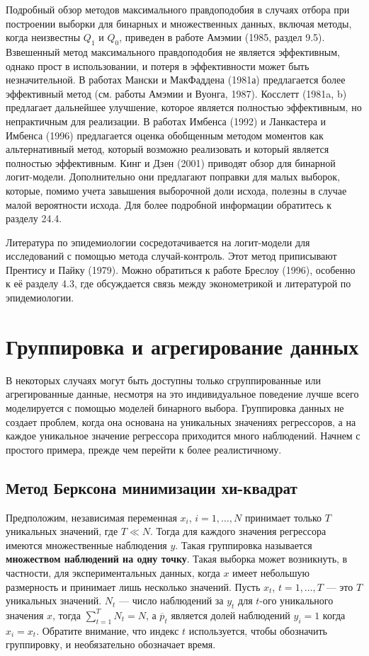 Подробный обзор   методов максимального правдоподобия в случаях отбора при построении выборки для бинарных и множественных данных,  включая методы,  когда неизвестны $Q_1$ и $Q_0$,  приведен в работе Амэмии (1985,  раздел 9.5). Взвешенный метод максимального правдоподобия не является эффективным,  однако прост в использовании,  и потеря в эффективности может быть незначительной. В работах Мански и МакФаддена (1981а) предлагается более эффективный метод (см. работы Амэмии и Вуонга,  1987). Косслетт (1981a, b) предлагает дальнейшее улучшение,  которое является полностью эффективным,  но непрактичным для реализации. В работах Имбенса  (1992)  и Ланкастера и Имбенса  (1996)  предлагается оценка обобщенным методом моментов как альтернативный метод,  который возможно реализовать и который является полностью эффективным. Кинг и Дзен  (2001)  приводят обзор для бинарной логит-модели. Дополнительно они предлагают поправки для малых выборок, которые,  помимо учета завышения выборочной доли исхода, полезны  в случае малой вероятности исхода. Для более подробной информации обратитесь к разделу 24.4.

Литература по эпидемиологии сосредотачивается на логит-модели для исследований с помощью метода случай-контроль. Этот метод приписывают Прентису и Пайку  (1979). Можно обратиться к работе Бреслоу  (1996),  особенно к её разделу 4.3,  где обсуждается связь между эконометрикой и литературой по эпидемиологии.

\section{ Группировка и агрегирование данных}

В некоторых случаях могут быть доступны только сгруппированные или агрегированные данные,  несмотря на это индивидуальное поведение лучше всего моделируется с помощью моделей бинарного выбора. Группировка данных не создает проблем,  когда она основана на уникальных значениях регрессоров,  а на каждое уникальное значение регрессора приходится много наблюдений.  Начнем с простого примера,  прежде чем перейти к более реалистичному.

\subsection{Метод Берксона минимизации хи-квадрат}

Предположим,  независимая переменная $x_i$, $i=1, \ldots, N$ принимает только $T$ уникальных значений,  где $T\ll N$. Тогда для каждого значения регрессора имеются множественные наблюдения $y$. Такая группировка называется \textbf{множеством наблюдений на одну точку}. Такая выборка может возникнуть,  в частности,  для экспериментальных данных,  когда $x$ имеет небольшую размерность и принимает лишь несколько значений. Пусть $x_t$,  $t=1, \ldots,  T$ --- это  $T$ уникальных значений. $N_t$ --- число наблюдений за $y_t$ для $t$-ого уникального значения $x$,  тогда $\sum^T_{t=1} N_t=N$, а $\overline{p}_t$ является долей наблюдений $y_i=1$ когда $x_i=x_t$. Обратите внимание,  что индекс $t$ используется,  чтобы обозначить группировку,  и необязательно обозначает время.

